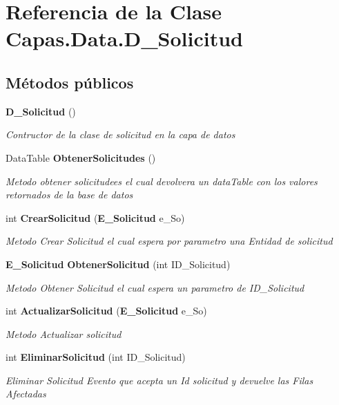 \section{Referencia de la Clase Capas.\+Data.\+D\+\_\+\+Solicitud}
\label{class_capas_1_1_data_1_1_d___solicitud}
\subsection*{Métodos públicos}
\begin{DoxyCompactItemize}
\item 
{\bf D\+\_\+\+Solicitud} ()
\begin{DoxyCompactList}\small\item\em Contructor de la clase de solicitud en la capa de datos \end{DoxyCompactList}\item 
Data\+Table {\bf Obtener\+Solicitudes} ()
\begin{DoxyCompactList}\small\item\em Metodo obtener solicitudees el cual devolvera un data\+Table con los valores retornados de la base de datos \end{DoxyCompactList}\item 
int {\bf Crear\+Solicitud} ({\bf E\+\_\+\+Solicitud} e\+\_\+\+So)
\begin{DoxyCompactList}\small\item\em Metodo Crear Solicitud el cual espera por parametro una Entidad de solicitud \end{DoxyCompactList}\item 
{\bf E\+\_\+\+Solicitud} {\bf Obtener\+Solicitud} (int I\+D\+\_\+\+Solicitud)
\begin{DoxyCompactList}\small\item\em Metodo Obtener Solicitud el cual espera un parametro de I\+D\+\_\+\+Solicitud \end{DoxyCompactList}\item 
int {\bf Actualizar\+Solicitud} ({\bf E\+\_\+\+Solicitud} e\+\_\+\+So)
\begin{DoxyCompactList}\small\item\em Metodo Actualizar solicitud \end{DoxyCompactList}\item 
int {\bf Eliminar\+Solicitud} (int I\+D\+\_\+\+Solicitud)
\begin{DoxyCompactList}\small\item\em Eliminar Solicitud Evento que acepta un Id solicitud y devuelve las Filas Afectadas \end{DoxyCompactList}\item 

\end{DoxyCompactItemize}
